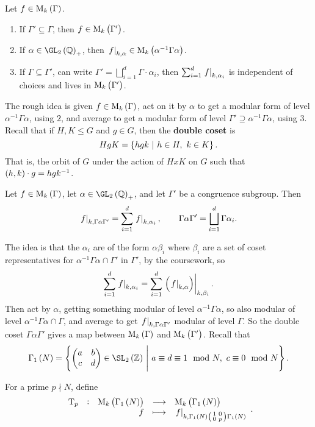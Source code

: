 
Let $ f \in \M_k\br{\Gamma} $.
\begin{enumerate}
\item If $ \Gamma' \subseteq \Gamma $, then $ f \in \M_k\br{\Gamma'} $.
\item If $ \alpha \in \GL_2\br{\QQ}_+ $, then $ \eval{f}_{k, \alpha} \in \M_k\br{\alpha^{-1}\Gamma\alpha} $.
\item If $ \Gamma \subseteq \Gamma' $, can write $ \Gamma' = \bigsqcup_{i = 1}^d \Gamma \cdot \alpha_i $, then $ \sum_{i = 1}^d \left. f \right|_{k, \alpha_i} $ is independent of choices and lives in $ \M_k\br{\Gamma'} $.
\end{enumerate}
The rough idea is given $ f \in \M_k\br{\Gamma} $, act on it by $ \alpha $ to get a modular form of level $ \alpha^{-1}\Gamma\alpha $, using $ 2 $, and average to get a modular form of level $ \Gamma' \supseteq \alpha^{-1}\Gamma\alpha $, using $ 3 $. Recall that if $ H, K \le G $ and $ g \in G $, then the \textbf{double coset} is
$$ HgK = \cbr{hgk \st h \in H, \ k \in K}. $$
That is, the orbit of $ G $ under the action of $ HxK $ on $ G $ such that $ \br{h, k} \cdot g = hgk^{-1} $.

\begin{definition}
Let $ f \in \M_k\br{\Gamma} $, let $ \alpha \in \GL_2\br{\QQ}_+ $, and let $ \Gamma' $ be a congruence subgroup. Then
$$ \left. f \right|_{k, \Gamma\alpha\Gamma'} = \sum_{i = 1}^d \left. f \right|_{k, \alpha_i}, \qquad \Gamma\alpha\Gamma' = \bigsqcup_{i = 1}^d \Gamma\alpha_i. $$
\end{definition}

The idea is that the $ \alpha_i $ are of the form $ \alpha\beta_i $ where $ \beta_i $ are a set of coset representatives for $ \alpha^{-1}\Gamma\alpha \cap \Gamma' $ in $ \Gamma' $, by the coursework, so
$$ \sum_{i = 1}^d \eval{f}_{k, \alpha_i} = \sum_{i = 1}^d \eval{\br{\eval{f}_{k, \alpha}}}_{k, \beta_i}. $$
Then act by $ \alpha $, getting something modular of level $ \alpha^{-1}\Gamma\alpha $, so also modular of level $ \alpha^{-1}\Gamma\alpha \cap \Gamma $, and average to get $ \left. f \right|_{k, \Gamma\alpha\Gamma'} $ modular of level $ \Gamma $. So the double coset $ \Gamma\alpha\Gamma' $ gives a map between $ \M_k\br{\Gamma} $ and $ \M_k\br{\Gamma'} $. Recall that
$$ \Gamma_1\br{N} = \cbr{\twobytwo{a}{b}{c}{d} \in \SL_2\br{\ZZ} \st a \equiv d \equiv 1 \mod N, \ c \equiv 0 \mod N}. $$

\begin{definition}
For a prime $ p \nmid N $, define
$$ \function[\T_p]{\M_k\br{\Gamma_1\br{N}}}{\M_k\br{\Gamma_1\br{N}}}{f}{\eval{f}_{k, \Gamma_1\br{N}\twobytwosmall{1}{0}{0}{p}\Gamma_1\br{N}}}. $$
\end{definition}

